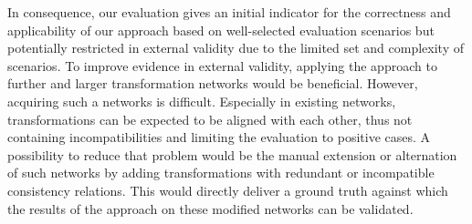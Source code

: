 


In consequence, our evaluation gives an initial indicator for the correctness and applicability of our approach based on well-selected evaluation scenarios but potentially restricted in external validity due to the limited set and complexity of scenarios.
To improve evidence in external validity, applying the approach to further and larger transformation networks would be beneficial.
However, acquiring such a networks is difficult.
Especially in existing networks, transformations can be expected to be aligned with each other, thus not containing incompatibilities and limiting the evaluation to positive cases.
A possibility to reduce that problem would be the manual extension or alternation of such networks by adding transformations with redundant or incompatible consistency relations.
This would directly deliver a ground truth against which the results of the approach on these modified networks can be validated.


